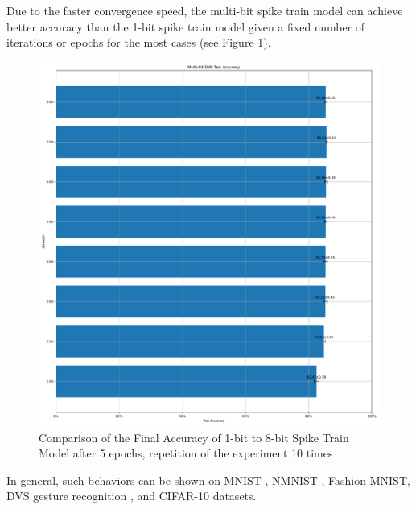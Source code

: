         Due to the faster convergence speed, the multi-bit spike train model can achieve better accuracy than the 1-bit spike train model given a fixed number of iterations or epochs for the most cases (see Figure \ref{fig:final_accuracy}).
        \begin{figure}[!htpb]
            \centering
            \includegraphics[width=\textwidth]{../standard/FashionMNIST/plots/fashionmnist_final_acc.pdf}
            \caption{Comparison of the Final Accuracy of 1-bit to 8-bit Spike Train Model after 5 epochs, repetition of the experiment 10 times}
            \label{fig:final_accuracy}
        \end{figure}

        In general, such behaviors can be shown on MNIST \cite{deng2012mnist}, NMNIST \cite{10.3389/fnins.2015.00437}, Fashion MNIST, DVS gesture recognition \cite{8100264}, and CIFAR-10 datasets.

